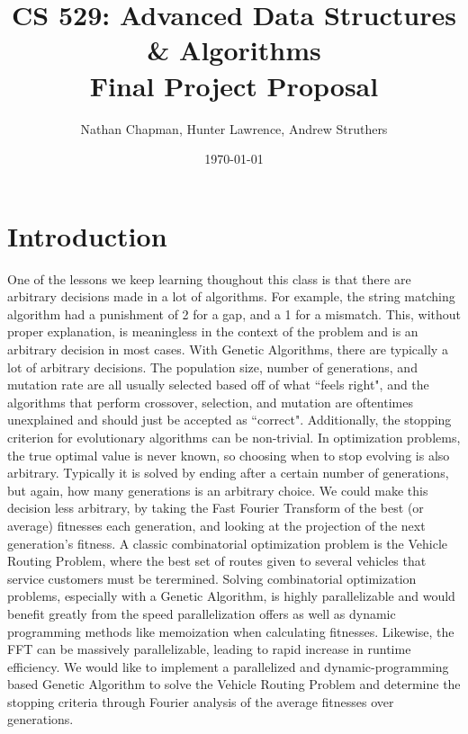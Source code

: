 \documentclass{article}
\title{\vspace*{-0.625in}CS 529: Advanced Data Structures \& Algorithms \\ Final Project Proposal}
\author{Nathan Chapman, Hunter Lawrence, Andrew Struthers}
\date{\today}
\renewcommand{\_}{\ifincsname_\else\legacyunderscore\fi}
\begin{document}
    \maketitle

\section*{Introduction}
One of the lessons we keep learning thoughout this class is that there are arbitrary decisions made in a lot of algorithms. For example, the string matching algorithm had a punishment of 2 for a gap, and a 1 for a mismatch. This, without proper explanation, is meaningless in the context of the problem and is an arbitrary decision in most cases. With Genetic Algorithms, there are typically a lot of arbitrary decisions. The population size, number of generations, and mutation rate are all usually selected based off of what ``feels right", and the algorithms that perform crossover, selection, and mutation are oftentimes unexplained and should just be accepted as ``correct". Additionally, the stopping criterion for evolutionary algorithms can be non-trivial. In optimization problems, the true optimal value is never known, so choosing when to stop evolving is also arbitrary. Typically it is solved by ending after a certain number of generations, but again, how many generations is an arbitrary choice. We could make this decision less arbitrary, by taking the Fast Fourier Transform of the best (or average) fitnesses each generation, and looking at the projection of the next generation's fitness. A classic combinatorial optimization problem is the Vehicle Routing Problem, where the best set of routes given to several vehicles that service customers must be terermined. Solving combinatorial optimization problems, especially with a Genetic Algorithm, is highly parallelizable and would benefit greatly from the speed parallelization offers as well as dynamic programming methods like memoization when calculating fitnesses. Likewise, the FFT can be massively parallelizable, leading to rapid increase in runtime efficiency. We would like to implement a parallelized and dynamic-programming based Genetic Algorithm to solve the Vehicle Routing Problem and determine the stopping criteria through Fourier analysis of the average fitnesses over generations. 
\end{document}
